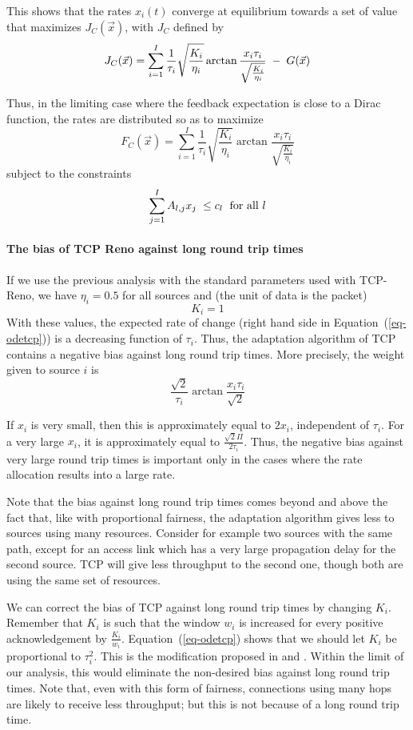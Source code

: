 This shows that
  the rates $x_{i}(t)$ converge at equilibrium towards a
  set of value that maximizes $J_{C}(\vec{x})$, with $J_{C}$ defined by
\begin{equation}\mylabel{eq-defJC}
  J_{C}(\vec{x}) =
  \sum_{i=1}^I
   \frac{1}{\tau_i}
   \sqrt{
      \frac{K_i}{\eta_i}
      }
   \arctan
   \frac{x_{i} \tau_i}{\sqrt{\frac{K_i}{\eta_i}}}
   \; -  \; G(\vec{x})
\end{equation}

  Thus, in the limiting case where the feedback expectation is close
to a Dirac function, the rates are distributed so as to maximize
$$F_{C}(\vec{x})=\sum_{i=1}^I \frac{1}{\tau_i}
   \sqrt{
      \frac{K_i}{\eta_i}
      }
   \arctan
   \frac{x_{i} \tau_i}{\sqrt{\frac{K_i}{\eta_i}}}$$
subject to the constraints
$$
\sum_{j=1}^I A_{l,j}x_{j} \; \leq c_{l} \; \textrm{ for all } l
$$

\paragraph{The bias of TCP Reno against long round trip times}

If we use the previous analysis with the standard parameters used
with TCP-Reno, we have $\eta_i=0.5$ for all sources and (the unit
of data is the packet)
 $$K_i = 1
 $$
With these values, the expected rate of change (right hand side in
Equation~(\ref{eq-odetcp})) is a decreasing function of $\tau_i$.
Thus, the adaptation algorithm of TCP contains a negative bias
against long round trip times. More precisely, the weight given to
source $i$ is
 $$\frac{\sqrt{2}}{\tau_i}
   \arctan
   \frac{x_{i} \tau_i}{\sqrt{2}}
 $$

 If $x_i$ is very small, then this is approximately equal to $2
 x_i$, independent of $\tau_i$. For a very large $x_i$, it is
 approximately equal to $\frac{\sqrt{2} \Pi}{2 \tau_i}$. Thus,
 the negative bias against very large round trip times is
 important
 only in the cases where the rate allocation results into a large
 rate.

 Note that the bias against long round trip times comes beyond and
 above the fact that, like with proportional fairness, the
 adaptation algorithm gives less to sources using many resources.
 Consider for example two sources with the same path, except for an access
 link which has a very large propagation delay for the second source.
 TCP will give less throughput to the second one, though both are
 using the same set of resources.

 We can correct the bias of TCP against long round trip times by
 changing $K_i$. Remember that $K_i$ is such that the
 window $w_i$ is increased for every positive acknowledgement by $\frac{K_i}{w_i}$.
  Equation~(\ref{eq-odetcp}) shows that we should
 let $K_i$ be proportional to $\tau_i^2$. This is the modification
 proposed in \cite{floyd-91-b} and
\cite{henderson-98-a}. Within the limit of our analysis, this
would
 eliminate the non-desired bias against long round trip times.
 Note that, even with this form of fairness, connections using
 many hops are likely to receive less throughput; but this is not
 because of a long round trip time.

